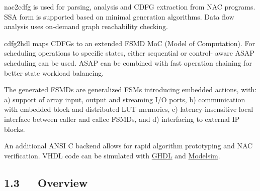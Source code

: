 \documentclass[a4paper]{article}
\begin{document}
nac2cdfg is used for parsing, analysis and CDFG extraction from NAC programs.
SSA form is supported based on minimal generation algorithms. Data flow
analysis uses on-demand graph reachability checking.

cdfg2hdl maps CDFGs to an extended FSMD MoC (Model of Computation).
For scheduling operations to specific states, either sequential or control-
aware ASAP scheduling can be used. ASAP can be combined with fast operation
chaining for better state workload balancing.

The generated FSMDs are generalized FSMs introducing embedded actions, with:
a) support of array input, output and streaming I/O ports,
b) communication with embedded block and distributed LUT memories,
c) latency-insensitive local interface between caller and callee FSMDs,
and d) interfacing to external IP blocks.

An additional ANSI C backend allows for rapid algorithm prototyping and NAC
verification. VHDL code can be simulated with \href{http://ghdl.free.fr}{GHDL} and \href{http://www.model.com}{Modelsim}.


\subsection{1.3~~~Overview%
  \label{overview}%
}
\end{document}
